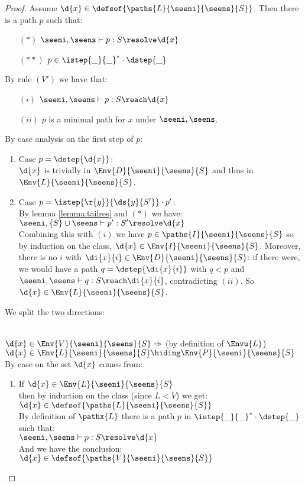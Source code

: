 \begin{proof}
Assume $\d{x} \in \defsof{\paths{L}{\seeni}{\seens}{S}}$. Then there is a path $p$ such that:
\begin{itemize}[leftmargin=15mm]
 \item[$(*)$] $\seeni,\seens \vdash p : S \resolve \d{x}$
 \item[$(**)$] $p \in \istep{\_}{\_}^*\cdot  \dstep{\_}$
\end{itemize}
By rule $(V')$ we have that:
\begin{itemize}[leftmargin=15mm]
 \item[$(i)$] $\seeni,\seens \vdash p : S \reach \d{x}$
 \item[$(ii)$] $p$ is a minimal path for $x$ under $\seeni,\seens$.
\end{itemize}
By case analysis on the first step of $p$: 
\begin{enumerate}
  \item Case $p =  \dstep{\d{x}}$: \\
   $\d{x}$ is trivially in $\Env{D}{\seeni}{\seens}{S}$ and thus in $\Env{L}{\seeni}{\seens}{S}$.
 \item Case $p = \istep{\r{y}}{\ds{y}{S'}}\cdot p'$:\\
 By lemma \ref{lemma:tailres} and $(*)$ we have:\\
\tab $\seeni,\{S\} \cup \seens \vdash p' : S' \resolve \d{x}$ \\
Combining this with $(i)$  we have $p \in \paths{I}{\seeni}{\seens}{S}$ 
so by induction on the class, $\d{x} \in \Env{I}{\seeni}{\seens}{S}$.
Moreover, there is no $i$ with $\di{x}{i} \in \Env{D}{\seeni}{\seens}{S}$: if there were, 
we would have a path $q = \dstep{\di{x}{i}}$ with $q < p$ and $\seeni,\seens \vdash q : S \reach \di{x}{i}$, contradicting $(ii)$.
So $\d{x} \in\Env{L}{\seeni}{\seens}{S}$.
\end{enumerate}

\noindent {}
We split the two directions:

\\ 
$\d{x} \in \Env{V}{\seeni}{\seens}{S} \Rightarrow$ (by definition of $\Envu{L}$) \\
$\d{x} \in \Env{L}{\seeni}{\seens}{S} \hiding \Env{P}{\seeni}{\seens}{S}$\\
By case on the set $\d{x}$ comes from:
\begin{enumerate}
 \item If $\d{x} \in \Env{L}{\seeni}{\seens}{S}$ \\
 then by induction on the class (since $L < V$) we get:\\
 $\d{x} \in \defsof{\paths{L}{\seeni}{\seens}{S}}$\\
By definition of $\pathx{L}$ there is a path $p$ in $\istep{\_}{\_}^*\cdot \dstep{\_}$ such that:\\
 $\seeni,\seens \vdash p : S \resolve \d{x}$\\
And we have the conclusion:\\
 $\d{x} \in \defsof{\paths{V}{\seeni}{\seens}{S}}$


\end{enumerate}
\end{proof}
